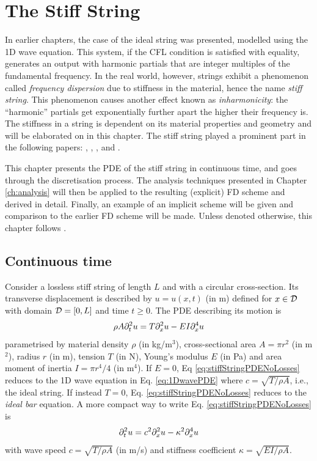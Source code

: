 \chapter{The Stiff String}\label{ch:stiffString}
In earlier chapters, the case of the ideal string was presented, modelled using the 1D wave equation. This system, if the CFL condition is satisfied with equality, generates an output with harmonic partials that are integer multiples of the fundamental frequency. In the real world, however, strings exhibit a phenomenon called \textit{frequency dispersion} due to stiffness in the material, hence the name \textit{stiff string}. This phenomenon causes another effect known as \textit{inharmonicity}: the ``harmonic'' partials get exponentially further apart the higher their frequency is. The stiffness in a string is dependent on its material properties and geometry and will be elaborated on in this chapter. The stiff string played a prominent part in the following papers: \citeP[A], \citeP[B], \citeP[C], \citeP[D] and \citeP[E].

This chapter presents the PDE of the stiff string in continuous time, and goes through the discretisation process. The analysis techniques presented in Chapter \ref{ch:analysis} will then be applied to the resulting (explicit) FD scheme and derived in detail. Finally, an example of an implicit scheme will be given and comparison to the earlier FD scheme will be made. Unless denoted otherwise, this chapter follows \cite{theBible}.

\section{Continuous time}
Consider a lossless stiff string of length $L$ and with a circular cross-section. Its transverse displacement is described by $u=u(x,t)$ (in m) defined for $x\in \mathcal{D}$ with domain $\mathcal{D} = [0, L]$ and time $t\geq 0$. The PDE describing its motion is 
\begin{equation}\label{eq:stiffStringPDENoLosses}
    \rho A \partial_t^2 u = T \partial_x^2 u - EI \partial_x^4 u
\end{equation}
parametrised by material density $\rho$ (in kg/m$^3$), cross-sectional area $A = \pi r^2$ (in m$^2$), radius $r$ (in m), tension $T$ (in N), Young's modulus $E$ (in Pa) and area moment of inertia $I = \pi r^4/4$ (in m$^4$). If $E = 0$, Eq \eqref{eq:stiffStringPDENoLosses} reduces to the 1D wave equation in Eq. \eqref{eq:1DwavePDE} where $c = \sqrt{T/\rho A}$, i.e., the ideal string. If instead $T = 0$, Eq. \eqref{eq:stiffStringPDENoLosses} reduces to the \textit{ideal bar} equation. A more compact way to write Eq. \eqref{eq:stiffStringPDENoLosses} is 
\begin{equation}
    \partial_t^2 u = c^2 \partial_x^2 u - \kappa^2 \partial_x^4 u
\end{equation}
with wave speed $c = \sqrt{T/\rho A}$ (in m/s) and stiffness coefficient $\kappa = \sqrt{EI / \rho A}$. 

